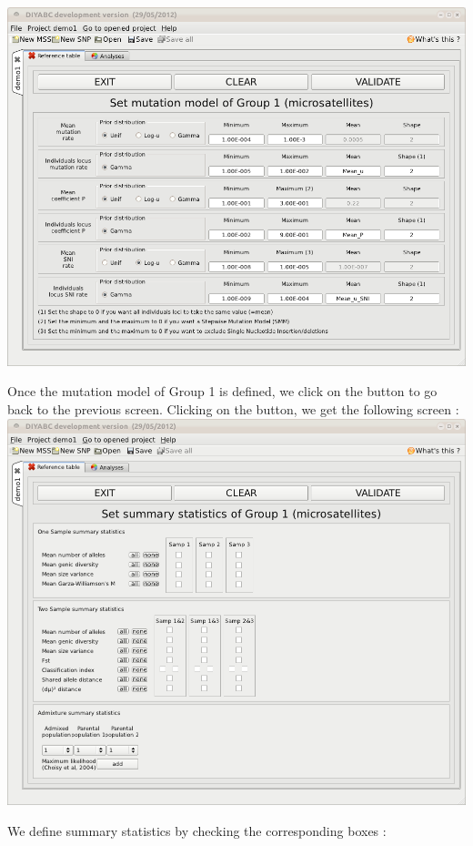 \includegraphics[scale=0.35]{gui_pictures/Capture-DIYABC-19.png} 

Once the mutation model of Group 1 is defined, we click on the  button to go back to the previous screen. Clicking on the  button, we get the following screen :\\ 

\includegraphics[scale=0.35]{gui_pictures/Capture-DIYABC-20.png} 

We define summary statistics by checking the corresponding boxes :\\ 


